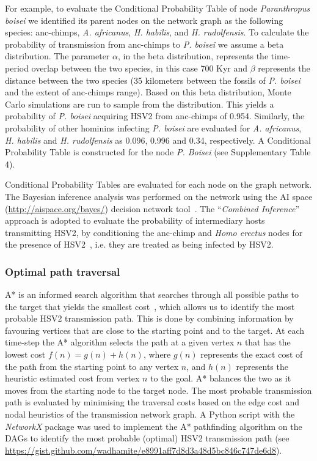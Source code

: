 \documentclass[fleqn,10pt]{wlscirep}
\begin{document}
For example, to evaluate the Conditional Probability Table of node \textit{Paranthropus boisei} we identified its parent nodes on the network graph as the following species: anc-chimps, \textit{A. africanus}, \textit{H. habilis}, and \textit{H. rudolfensis}. To calculate the probability of transmission from anc-chimps to \textit{P. boisei} we assume a beta distribution. The parameter $\alpha$, in the beta distribution, represents the time-period overlap between the two species, in this case 700 Kyr and $\beta$ represents the distance between the two species (35 kilometers between the fossils of \textit{P. boisei} and the extent of anc-chimps range). Based on this beta distribution, Monte Carlo simulations are run to sample from the distribution. This yields a probability of \textit{P. boisei} acquiring HSV2 from anc-chimps of 0.954. Similarly, the probability of other hominins infecting \textit{P. boisei} are evaluated for \textit{A. africanus}, \textit{H. habilis} and \textit{H. rudolfensis} as 0.096, 0.996 and 0.34, respectively.  A Conditional Probability Table is constructed for the node \textit{P. Boisei} (see Supplementary Table 4).

Conditional Probability Tables are evaluated for each node on the graph network. The Bayesian inference analysis was performed on the network using the AI space (\url{http://aispace.org/bayes/}) decision network tool~\citep{poole2010artificial}. The ``\textit{Combined Inference}'' approach is adopted to evaluate the probability of intermediary hosts transmitting HSV2, by conditioning the anc-chimp and \textit{Homo erectus} nodes for the presence of HSV2~\citep{Korb2003}, i.e. they are treated as being infected by HSV2.

\subsubsection*{Optimal path traversal}

A* is an informed search algorithm that searches through all possible paths to the target that yields the smallest cost~\citep{Hart1968}, which allows us to identify the most probable HSV2 transmission path. This is done by combining information by favouring vertices that are close to the starting point and to the target. At each time-step the A* algorithm selects the path at a given vertex $n$ that has the lowest cost $f(n) = g(n) + h(n)$, where $g(n)$ represents the exact cost of the path from the starting point to any vertex $n$, and $h(n)$ represents the heuristic estimated cost from vertex $n$ to the goal. A* balances the two as it moves from the starting node to the target node. The most probable transmission path is evaluated by minimising the traversal costs based on the edge cost and nodal heuristics of the transmission network graph. A Python script with the \textit{NetworkX} package was used to implement the A* pathfinding algorithm on the DAGs to identify the most probable (optimal) HSV2 transmission path (see \url{https://gist.github.com/wadhamite/e8991aff7d8d3a48d5bc846c747de6d8}).
\end{document}
